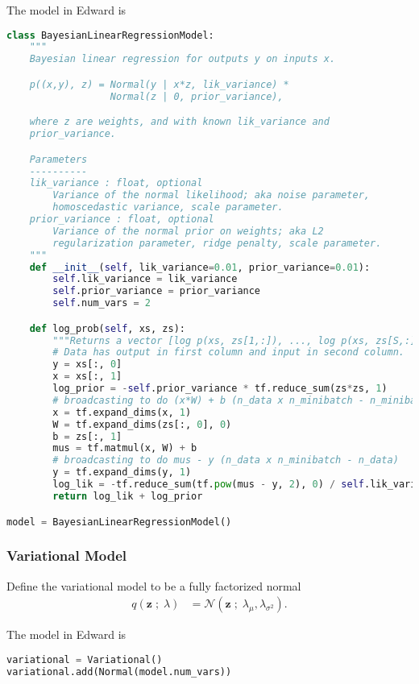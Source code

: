 The model in Edward is 
\begin{lstlisting}[language=Python]
class BayesianLinearRegressionModel:
    """
    Bayesian linear regression for outputs y on inputs x.

    p((x,y), z) = Normal(y | x*z, lik_variance) *
                  Normal(z | 0, prior_variance),

    where z are weights, and with known lik_variance and
    prior_variance.

    Parameters
    ----------
    lik_variance : float, optional
        Variance of the normal likelihood; aka noise parameter,
        homoscedastic variance, scale parameter.
    prior_variance : float, optional
        Variance of the normal prior on weights; aka L2
        regularization parameter, ridge penalty, scale parameter.
    """
    def __init__(self, lik_variance=0.01, prior_variance=0.01):
        self.lik_variance = lik_variance
        self.prior_variance = prior_variance
        self.num_vars = 2

    def log_prob(self, xs, zs):
        """Returns a vector [log p(xs, zs[1,:]), ..., log p(xs, zs[S,:])]."""
        # Data has output in first column and input in second column.
        y = xs[:, 0]
        x = xs[:, 1]
        log_prior = -self.prior_variance * tf.reduce_sum(zs*zs, 1)
        # broadcasting to do (x*W) + b (n_data x n_minibatch - n_minibatch)
        x = tf.expand_dims(x, 1)
        W = tf.expand_dims(zs[:, 0], 0)
        b = zs[:, 1]
        mus = tf.matmul(x, W) + b
        # broadcasting to do mus - y (n_data x n_minibatch - n_data)
        y = tf.expand_dims(y, 1)
        log_lik = -tf.reduce_sum(tf.pow(mus - y, 2), 0) / self.lik_variance
        return log_lik + log_prior

model = BayesianLinearRegressionModel()
\end{lstlisting}


\subsubsection{Variational Model}
Define the variational model to be a fully factorized normal
\begin{align*}
  q(\mathbf{z} \;;\; \lambda)
  &=
  \mathcal{N}(\mathbf{z} \;;\; \lambda_\mu, \lambda_{\sigma^2}).
\end{align*} 

The model in Edward is
\begin{lstlisting}[language=Python]
variational = Variational()
variational.add(Normal(model.num_vars))
\end{lstlisting}


